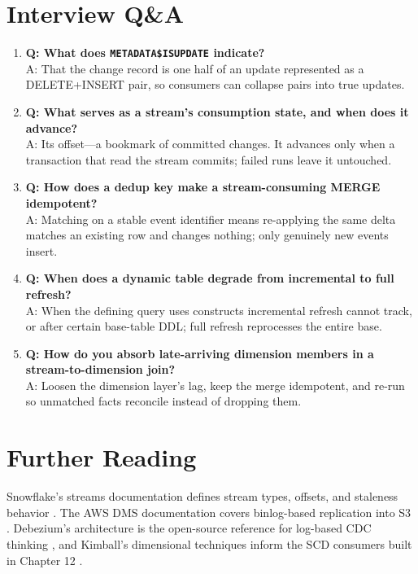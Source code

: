 \section{Interview Q\&A}
\begin{enumerate}
    \item \textbf{Q: What does \texttt{METADATA\$ISUPDATE} indicate?}\\
    A: That the change record is one half of an update represented as a DELETE+INSERT pair, so consumers can collapse pairs into true updates.
    \item \textbf{Q: What serves as a stream's consumption state, and when does it advance?}\\
    A: Its offset---a bookmark of committed changes. It advances only when a transaction that read the stream commits; failed runs leave it untouched.
    \item \textbf{Q: How does a dedup key make a stream-consuming MERGE idempotent?}\\
    A: Matching on a stable event identifier means re-applying the same delta matches an existing row and changes nothing; only genuinely new events insert.
    \item \textbf{Q: When does a dynamic table degrade from incremental to full refresh?}\\
    A: When the defining query uses constructs incremental refresh cannot track, or after certain base-table DDL; full refresh reprocesses the entire base.
    \item \textbf{Q: How do you absorb late-arriving dimension members in a stream-to-dimension join?}\\
    A: Loosen the dimension layer's lag, keep the merge idempotent, and re-run so unmatched facts reconcile instead of dropping them.
\end{enumerate}

\section{Further Reading}
Snowflake's streams documentation defines stream types, offsets, and staleness behavior \cite{snowflakeStreamsDocs}. The AWS DMS documentation covers binlog-based replication into S3 \cite{awsDmsDocs}. Debezium's architecture is the open-source reference for log-based CDC thinking \cite{debeziumDocs}, and Kimball's dimensional techniques inform the SCD consumers built in Chapter 12 \cite{kimball2013toolkit}.

